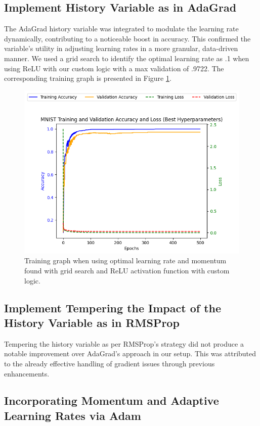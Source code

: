\documentclass[letterpaper]{article}
\begin{document}
\subsection{Implement History Variable as in AdaGrad}
\label{subsec:adagrad}
The AdaGrad history variable was integrated to modulate the learning rate dynamically, contributing to a noticeable boost in accuracy. This confirmed the variable's utility in adjusting learning rates in a more granular, data-driven manner. We used a grid search to identify the optimal learning rate as .1 when using ReLU with our custom logic with a max validation of .9722. The corresponding training graph is presented in Figure \ref{fig:custom_relu_history_optimal}.
\begin{figure}[h]
    \centering
    \includegraphics[width=0.8\linewidth]{custom_relu_history_optimal.png} %
    \caption{Training graph when using optimal learning rate and momentum found with grid search and ReLU activation function with custom logic.}
    \label{fig:custom_relu_history_optimal}
\end{figure}

\subsection{Implement Tempering the Impact of the History Variable as in RMSProp}
\label{subsec:rmsprop}
Tempering the history variable as per RMSProp's strategy did not produce a notable improvement over AdaGrad's approach in our setup. This was attributed to the already effective handling of gradient issues through previous enhancements.

\subsection{Incorporating Momentum and Adaptive Learning Rates via Adam}
\label{subsec:adam}
\end{document}
